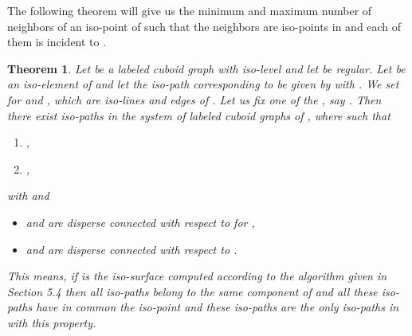 \documentclass[a4paper,11pt]{article}
\newtheorem{theorem}{Theorem}[section]
\begin{document}
The following theorem will give us the minimum and maximum number of neighbors of an iso-point  of
 such that the neighbors are iso-points in  and each of them is incident to .

\begin{theorem}Let  be a labeled cuboid graph with iso-level  and let
 be regular. Let  be an iso-element of  and let the iso-path  corresponding to  be
given by  with . We set  for
 and , which are iso-lines and edges of . Let us fix
one of the , say . Then there exist  iso-paths 
in the system of labeled cuboid graphs of , where  such that
\begin{enumerate}
\item ,
\item ,
\end{enumerate}
with  and
\begin{itemize}
\item[(i)]  and  are disperse connected with respect to  for ,
\item[(ii)]  and  are disperse connected with respect to .
\end{itemize}
This means, if  is the iso-surface computed according to the algorithm given in Section 5.4 then all iso-paths
 belong to the same component  of  and all these iso-paths have in
common the iso-point  and these iso-paths are the only iso-paths in  with this property.
\label{thm:iso-path-region-curvature}
\end{theorem}
\end{document}
